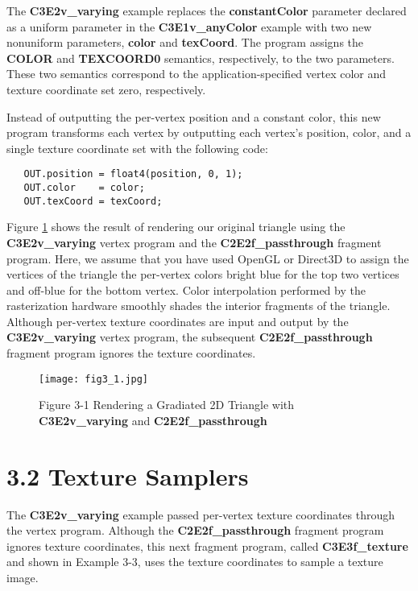 \documentclass[../main.tex]{subfiles}
\begin{document}
The \textbf{C3E2v_varying} example replaces the \textbf{constantColor} parameter declared as a uniform parameter in the \textbf{C3E1v_anyColor} example with two new nonuniform parameters, \textbf{color} and \textbf{texCoord}. The program assigns the \textbf{COLOR} and \textbf{TEXCOORD0} semantics, respectively, to the two parameters. These two semantics correspond to the application-specified vertex color and texture coordinate set zero, respectively.

Instead of outputting the per-vertex position and a constant color, this new program transforms each vertex by outputting each vertex's position, color, and a single texture coordinate set with the following code:

\FloatBarrier
\begin{lstlisting}
   OUT.position = float4(position, 0, 1);
   OUT.color    = color;
   OUT.texCoord = texCoord;
\end{lstlisting}
\FloatBarrier

Figure \ref{fig:3-1} shows the result of rendering our original triangle using the \textbf{C3E2v_varying} vertex program and the \textbf{C2E2f_passthrough} fragment program. Here, we assume that you have used OpenGL or Direct3D to assign the vertices of the triangle the per-vertex colors bright blue for the top two vertices and off-blue for the bottom vertex. Color interpolation performed by the rasterization hardware smoothly shades the interior fragments of the triangle. Although per-vertex texture coordinates are input and output by the \textbf{C3E2v_varying} vertex program, the subsequent \textbf{C2E2f_passthrough} fragment program ignores the texture coordinates.

\begin{figure}
    \centering
    \texttt{[image: fig3\_1.jpg]}
    \caption{Figure 3-1 Rendering a Gradiated 2D Triangle with \textbf{C3E2v_varying} and \textbf{C2E2f_passthrough}}
    \label{fig:3-1}
\end{figure}

\section{3.2 Texture Samplers}

The \textbf{C3E2v_varying} example passed per-vertex texture coordinates through the vertex program. Although the \textbf{C2E2f_passthrough} fragment program ignores texture coordinates, this next fragment program, called \textbf{C3E3f_texture} and shown in Example 3-3, uses the texture coordinates to sample a texture image.
\end{document}
